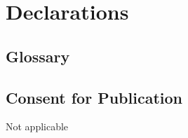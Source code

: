 \documentclass[a4paper,num-refs,numbers,sort&compress]{de-rse}
\begin{document}
\section{Declarations}

\subsection{Glossary}\label{subsec:glossary}

\printnoidxglossaries









\subsection{Consent for Publication}

Not applicable
\end{document}
